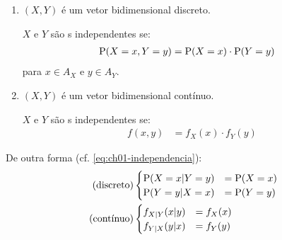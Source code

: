 \begin{definition}
    \begin{enumerate}
        \item $(X, Y)$ é um vetor bidimensional discreto.
        
        $X$ e $Y$ são \va s independentes se:
        \begin{align}
            \operatorname{P}(X = x , Y = y) &= \operatorname{P}(X = x) \cdot \operatorname{P}(Y = y)
            \label{eq:ch03-indep-discreto}
        \end{align}
        para $x \in A_X$ e $y \in A_Y$.

        \item $(X, Y)$ é um vetor bidimensional contínuo.

        $X$ e $Y$ são \va s independentes se:
        \begin{align}
            f(x, y) &= f_X(x) \cdot f_Y(y)
            \label{eq:ch03-indep-continuo}
        \end{align}
    \end{enumerate}

    \begin{obs}
        De outra forma (cf. \cref{eq:ch01-independencia}):
        \begin{align}
            \text{(discreto)} & \begin{cases}
                \operatorname{P}(X = x | Y = y) &= \operatorname{P}(X = x) \\
                \operatorname{P}(Y = y | X = x) &= \operatorname{P}(Y = y)
            \end{cases} \\
            \text{(contínuo)} & \begin{cases}
                f_{X|Y}(x | y) &= f_X(x) \\
                f_{Y|X}(y | x) &= f_Y(y)
            \end{cases}
        \end{align}
    \end{obs}
\end{definition}

